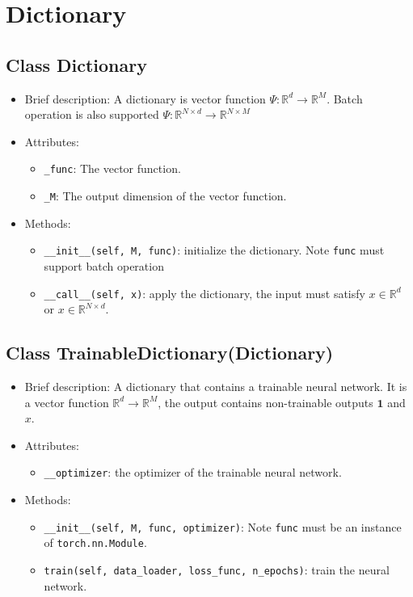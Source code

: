 \documentclass[en, bibend=bibtex]{elegantpaper}
\theoremstyle{plain}
\begin{document}
\section{Dictionary}

\subsection{Class Dictionary}

\begin{itemize}
\item Brief description: A dictionary is vector function
  $\Psi: \mathbb{R}^d \rightarrow \mathbb{R}^M$.
  Batch operation is also supported $\Psi: \mathbb{R}^{N \times d} \rightarrow
  \mathbb{R}^{N \times M}$
\item Attributes:
  \begin{itemize}
  \item \lstinline|_func|: The vector function.
  \item \lstinline|_M|: The output dimension of the vector function.
  \end{itemize}
\item Methods:
  \begin{itemize}
  \item \lstinline|__init__(self, M, func)|: initialize the dictionary.
    Note \lstinline|func| must support batch operation
  \item \lstinline|__call__(self, x)|: apply the dictionary,
    the input must satisfy $x \in \mathbb{R}^d$ or $x \in \mathbb{R}^{N \times d}$.
  \end{itemize}
\end{itemize}

\subsection{Class TrainableDictionary(Dictionary)}

\begin{itemize}
\item Brief description: A dictionary that contains a trainable neural network.
  It is a vector function $\mathbb{R}^d \rightarrow \mathbb{R}^M$,
  the output contains non-trainable outputs $\mathbf{1}$ and $x$.
\item Attributes:
  \begin{itemize}
  \item \lstinline|__optimizer|: the optimizer of the trainable neural network.
  \end{itemize}
\item Methods:
  \begin{itemize}
  \item \lstinline|__init__(self, M, func, optimizer)|:
  Note \lstinline|func| must be an instance of \lstinline|torch.nn.Module|.
  \item \lstinline|train(self, data_loader, loss_func, n_epochs)|:
  train the neural network.
  \end{itemize}
\end{itemize}
\end{document}
